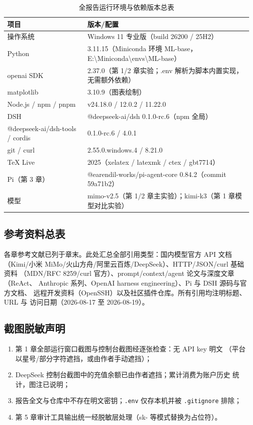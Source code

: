 \begin{table}[H]
\centering
\caption{全报告运行环境与依赖版本总表}
\label{tab:appendix_env}
\small
\setlength{\tabcolsep}{4pt}
\begin{tabular}{lp{8.2cm}}
\toprule
\textbf{项目} & \textbf{版本/配置} \\
\midrule
操作系统 & Windows 11 专业版（build 26200 / 25H2） \\
Python & 3.11.15（Miniconda 环境 ML-base，E:\textbackslash{}Miniconda\textbackslash{}envs\textbackslash{}ML-base） \\
openai SDK & 2.37.0（第 1/2 章实验；.env 解析为脚本内置实现，无需额外依赖） \\
matplotlib & 3.10.9（图表绘制） \\
Node.js / npm / pnpm & v24.18.0 / 12.0.2 / 11.22.0 \\
DSH & @deepseek-ai/dsh 0.1.0-rc.6（npm 全局） \\
@deepseek-ai/dsh-tools / cordis & 0.1.0-rc.6 / 4.0.1 \\
git / curl & 2.55.0.windows.4 / 8.21.0 \\
TeX Live & 2025（xelatex / latexmk / ctex / gbt7714） \\
Pi（第 3 章） & @earendil-works/pi-agent-core 0.84.2（commit 59a71b2） \\
模型 & mimo-v2.5（第 1/2 章主实验）；kimi-k3（第 1 章模型对比实验） \\
\bottomrule
\end{tabular}
\end{table}

\subsection{参考资料总表}

各章参考文献已列于章末。此处汇总全部引用类型：国内模型官方 API 文档
（Kimi/小米 MiMo/火山方舟/阿里云百炼/DeepSeek）、HTTP/JSON/curl 基础资料
（MDN/RFC 8259/curl 官方）、prompt/context/agent 论文与深度文章（ReAct、
Anthropic 系列、OpenAI harness engineering）、Pi 与 DSH 源码与官方文档、
远程开发资料（OpenSSH）以及社区插件仓库。所有引用均注明标题、URL 与
访问日期（2026-08-17 至 2026-08-19）。

\subsection{截图脱敏声明}

\begin{enumerate}[leftmargin=4em,itemsep=0pt,topsep=2pt]
    \item 第 1 章全部运行窗口截图与控制台截图经逐张检查：无 API key 明文
          （平台以星号/部分字符遮挡，或由作者手动遮挡）；
    \item DeepSeek 控制台截图中的充值余额已由作者遮挡；累计消费为账户历史
          统计，图注已说明；
    \item 报告全文与仓库中不存在明文密钥；\texttt{.env} 仅存本机并被
          \texttt{.gitignore} 排除；
    \item 第 5 章审计工具输出统一经脱敏层处理（sk- 等模式替换为占位符）。
\end{enumerate}
